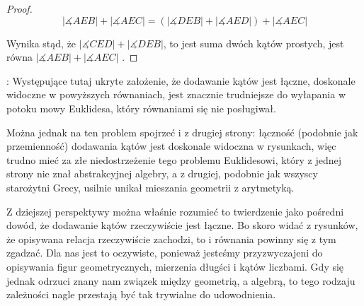 \documentclass[12pt, a4paper]{scrartcl}
\begin{document}
\begin{theorem}
\begin{proof}
        \[ |\measuredangle AEB| + |\measuredangle AEC| = (|\measuredangle DEB|
            + |\measuredangle AED|) + |\measuredangle AEC| \]

        Wynika stąd, że \(|\measuredangle CED| + |\measuredangle DEB|\), to jest
        suma dwóch kątów prostych, jest równa \(|\measuredangle AEB| +
        |\measuredangle AEC|\) .
    \end{proof}
    :
      Występujące tutaj ukryte założenie, że dodawanie kątów jest łączne,
      doskonale widoczne w powyższych równaniach, jest znacznie trudniejsze
      do wyłapania w potoku mowy Euklidesa, który równaniami się nie
      posługiwał.

      Można jednak na ten problem spojrzeć i z drugiej strony: łączność
      (podobnie jak przemienność) dodawania kątów jest doskonale widoczna
      w rysunkach, więc trudno mieć za złe niedostrzeżenie tego problemu
      Euklidesowi, który z jednej strony nie znał abstrakcyjnej algebry, a
      z drugiej, podobnie jak wszyscy starożytni Grecy, usilnie unikał
      mieszania geometrii z arytmetyką.

      Z dziejszej perspektywy można właśnie rozumieć to twierdzenie jako
      pośredni dowód, że dodawanie kątów rzeczywiście jest łączne. Bo skoro
      widać z rysunków, że opisywana relacja rzeczywiście zachodzi, to i
      równania powinny się z tym zgadzać. Dla nas jest to oczywiste, ponieważ
      jesteśmy przyzwyczajeni do opisywania figur geometrycznych, mierzenia
      długści i kątów liczbami. Gdy się jednak odrzuci znany nam związek między
      geometrią, a algebrą, to tego rodzaju zależności nagle przestają być tak
      trywialne do udowodnienia.
\end{theorem}
\end{document}

